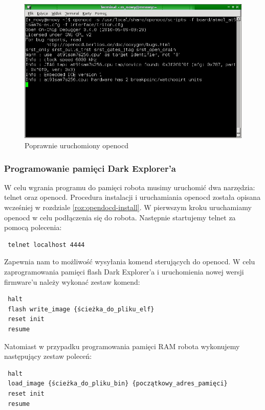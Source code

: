 \begin{figure}[h!]
 \centering
 \includegraphics[width=150.0mm]{../images/ch03/openocd.jpg}
 \caption{Poprawnie uruchomiony openocd}
 \label{fig:openocd}
\end{figure}

\subsubsection{Programowanie pamięci Dark Explorer'a}
W celu wgrania programu do pamięci robota musimy uruchomić dwa narzędzia: telnet
oraz openocd. Procedura instalacji i uruchamiania openocd została opisana
wcześniej w rozdziale \ref{roz:opendocd-install}. W pierwszym kroku uruchamiamy
openocd w celu podłączenia się do robota. Następnie startujemy telnet za pomocą
polecenia:

\begin{verbatim}
 telnet localhost 4444
\end{verbatim}

Zapewnia nam to możliwość wysyłania komend sterujących do openocd. W celu
zaprogramowania pamięci flash Dark Explorer'a i uruchomienia nowej wersji
firmware'u należy wykonać zestaw komend:

\begin{verbatim}
 halt
 flash write_image {ścieżka_do_pliku_elf}
 reset init
 resume
\end{verbatim}

Natomiast w przypadku programowania pamięci RAM robota wykonujemy następujący
zestaw poleceń:

\begin{verbatim}
 halt
 load_image {ścieżka_do_pliku_bin} {początkowy_adres_pamięci}
 reset init
 resume
\end{verbatim}